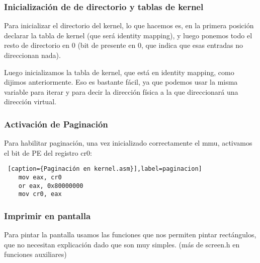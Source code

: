 \subsubsection*{Inicialización de de directorio y tablas de kernel}

\par Para inicializar el directorio del kernel, lo que hacemos es, en la primera posición declarar la tabla de kernel (que será identity mapping), y luego ponemos todo el resto de directorio en 0 (bit de presente en 0, que indica que esas entradas no direccionan nada).

\par Luego inicializamos la tabla de kernel, que está en identity mapping, como dijimos anteriormente. Eso es bastante fácil, ya que podemos usar la misma variable para iterar y para decir la dirección física a la que direccionará una dirección virtual.

\subsubsection*{Activación de Paginación}

\par Para habilitar paginación, una vez inicializado correctamente el mmu, activamos el bit de PE del registro cr0:
\begin{lstlisting} [caption={Paginación en kernel.asm}],label=paginacion] 
    mov eax, cr0
    or eax, 0x80000000
    mov cr0, eax
\end{lstlisting}
    
\subsubsection*{Imprimir en pantalla}

\par Para pintar la pantalla usamos las funciones que nos permiten pintar rectángulos, que no necesitan explicación dado que son muy simples. (más de screen.h en funciones auxiliares)